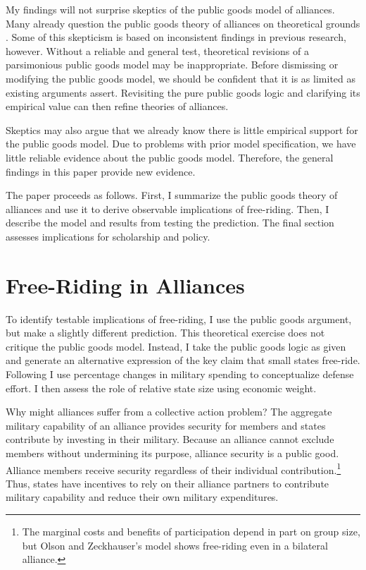\documentclass[12pt]{article}
\begin{document}
My findings will not surprise skeptics of the public goods model of alliances. 
Many already question the public goods theory of alliances on theoretical grounds \citep{Palmer1990, GatesTerasawa1992, SandlerHartley2001, Norrlof2010, NiouZeigler2019}.
Some of this skepticism is based on inconsistent findings in previous research, however. 
Without a reliable and general test, theoretical revisions of a parsimonious public goods model may be inappropriate.
Before dismissing or modifying the public goods model, we should be confident that it is as limited as existing arguments assert.
Revisiting the pure public goods logic and clarifying its empirical value can then refine theories of alliances. 


Skeptics may also argue that we already know there is little empirical support for the public goods model. 
Due to problems with prior model specification, we have little reliable evidence about the public goods model. 
Therefore, the general findings in this paper provide new evidence. 


The paper proceeds as follows.
First, I summarize the public goods theory of alliances and use it to derive observable implications of free-riding.
Then, I describe the model and results from testing the prediction. 
The final section assesses implications for scholarship and policy. 



\section{Free-Riding in Alliances}

To identify testable implications of free-riding, I use the public goods argument, but make a slightly different prediction.
This theoretical exercise does not critique the public goods model.
Instead, I take the public goods logic as given and generate an alternative expression of the key claim that small states free-ride. 
Following \citet{PluemperNeumayer2015} I use percentage changes in military spending to conceptualize defense effort.
I then assess the role of relative state size using economic weight. 


Why might alliances suffer from a collective action problem?
The aggregate military capability of an alliance provides security for members and states contribute by investing in their military.
Because an alliance cannot exclude members without undermining its purpose, alliance security is a public good. 
Alliance members receive security regardless of their individual contribution.\footnote{The marginal costs and benefits of participation depend in part on group size, but Olson and Zeckhauser's model shows free-riding even in a bilateral alliance.}
Thus, states have incentives to rely on their alliance partners to contribute military capability and reduce their own military expenditures.  
\end{document}
